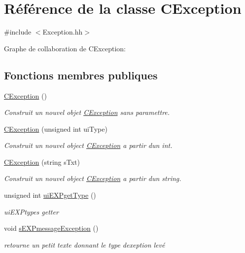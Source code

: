\hypertarget{classCException}{}\section{Référence de la classe C\+Exception}
\label{classCException}


{\ttfamily \#include $<$Exception.\+hh$>$}



Graphe de collaboration de C\+Exception\+:
\subsection*{Fonctions membres publiques}
\begin{DoxyCompactItemize}
\item 
\hyperlink{classCException_a193ebfae477160a82d6e44299af4ed10}{C\+Exception} ()
\begin{DoxyCompactList}\small\item\em Construit un nouvel objet \hyperlink{classCException}{C\+Exception} sans paramettre. \end{DoxyCompactList}\item 
\hyperlink{classCException_a84f4e7fa075fdd466c5b203048205a6b}{C\+Exception} (unsigned int ui\+Type)
\begin{DoxyCompactList}\small\item\em Construit un nouvel object \hyperlink{classCException}{C\+Exception} a partir d\textquotesingle{}un int. \end{DoxyCompactList}\item 
\hyperlink{classCException_aab8f2fdcdc5e4390e66a32c8706b9df8}{C\+Exception} (string s\+Txt)
\begin{DoxyCompactList}\small\item\em Construit un nouvel object \hyperlink{classCException}{C\+Exception} a partir d\textquotesingle{}un string. \end{DoxyCompactList}\item 
unsigned int \hyperlink{classCException_a916fc87bccf954a5e112967e4f90bb98}{ui\+E\+X\+Pget\+Type} ()
\begin{DoxyCompactList}\small\item\em ui\+E\+X\+Ptype\textquotesingle{}s getter \end{DoxyCompactList}\item 
void \hyperlink{classCException_a7b5dd75546b7c7bf13206633c8237336}{s\+E\+X\+Pmessage\+Exception} ()
\begin{DoxyCompactList}\small\item\em retourne un petit texte donnant le type d\textquotesingle{}exeption levé \end{DoxyCompactList}\end{DoxyCompactItemize}


